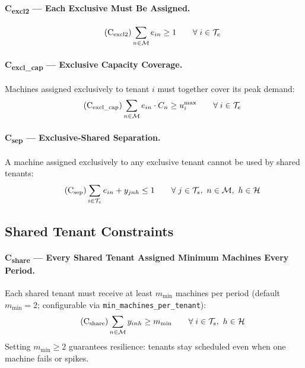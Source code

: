 \documentclass[11pt,a4paper]{article}
\newcommand{\Te}{\mathcal{T}_e}
\newcommand{\Ts}{\mathcal{T}_s}
\newcommand{\M}{\mathcal{M}}
\newcommand{\PH}{\mathcal{H}}
\newcommand{\umax}{u^{\max}}
\begin{document}
\paragraph{C\textsubscript{excl2} --- Each Exclusive Must Be Assigned.}
\begin{equation}\tag{C$_{\mathrm{excl2}}$}
  \sum_{n \in \M} e_{in} \geq 1 \qquad \forall\; i \in \Te
\end{equation}

\paragraph{C\textsubscript{excl\_cap} --- Exclusive Capacity Coverage.}
Machines assigned exclusively to tenant $i$ must together cover its peak demand:
\begin{equation}\tag{C$_{\mathrm{excl\_cap}}$}
  \sum_{n \in \M} e_{in}\cdot C_n \geq \umax_i \qquad \forall\; i \in \Te
\end{equation}

\paragraph{C\textsubscript{sep} --- Exclusive-Shared Separation.}
A machine assigned exclusively to any exclusive tenant cannot be used by shared tenants:
\begin{equation}\tag{C$_{\mathrm{sep}}$}
  \sum_{i \in \Te} e_{in} + y_{jnh} \leq 1
  \qquad \forall\; j \in \Ts,\ n \in \M,\ h \in \PH
\end{equation}

\subsection{Shared Tenant Constraints}

\paragraph{C\textsubscript{share} --- Every Shared Tenant Assigned Minimum Machines Every Period.}
Each shared tenant must receive at least $m_{\min}$ machines per period
(default $m_{\min}=2$; configurable via \texttt{min\_machines\_per\_tenant}):
\begin{equation}\tag{C$_{\mathrm{share}}$}
  \sum_{n \in \M} y_{inh} \geq m_{\min} \qquad \forall\; i \in \Ts,\ h \in \PH
\end{equation}
Setting $m_{\min}\geq 2$ guarantees resilience: tenants stay scheduled even when one machine fails or spikes.
\end{document}
